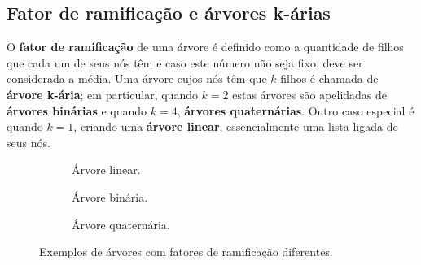 \subsection{Fator de ramificação e árvores k-árias}
    O \textbf{fator de ramificação} de uma árvore é definido como a
quantidade de filhos que cada um de seus nós têm e caso este número não seja fixo,
deve ser considerada a média. Uma árvore cujos nós têm \underline{}
que $k$ filhos é chamada de \textbf{árvore k-ária}; em particular, quando $k = 2$ estas
árvores são apelidadas de \textbf{árvores binárias} e quando $k = 4$,
\textbf{árvores quaternárias}. Outro caso especial é quando $k = 1$, criando uma
\textbf{árvore linear}, essencialmente uma lista ligada de seus nós.


\begin{figure}[H]
  \centering
  \begin{subfigure}[b]{0.3\textwidth}
    \centering
    \caption{Árvore linear.}
    \label{fig:arvorelinear}
\end{subfigure}
\hfill
  \begin{subfigure}[b]{0.3\textwidth}
      \centering
      \caption{Árvore binária.}
      \label{fig:arvorebinaria}
  \end{subfigure}
  \hfill
  \begin{subfigure}[b]{0.3\textwidth}
      \centering
      \caption{Árvore quaternária.}
      \label{fig:arvorequaternaria}
  \end{subfigure}
     \caption{Exemplos de árvores com fatores de ramificação diferentes.}
     \label{fig:ramificação}
\end{figure}

